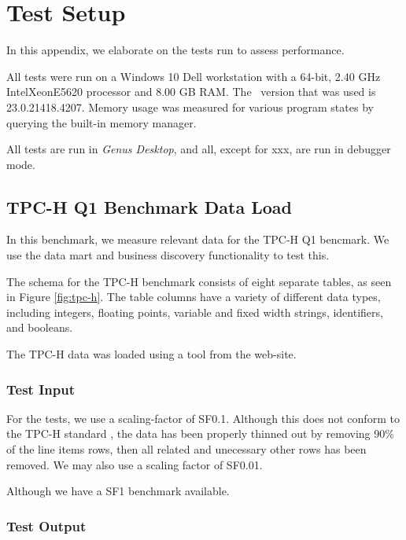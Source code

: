 \chapter{Test Setup}
\label{app:test-setup}
In this appendix, we elaborate on the tests run to assess performance.

All tests were run on a Windows 10 Dell workstation with a 64-bit, 2.40 GHz Intel\textregistered Xeon\textregistered E5620 processor and 8.00 GB RAM. The \delphi~version that was used is 23.0.21418.4207. Memory usage was measured for various program states by querying the built-in  memory manager.

All tests are run in \textit{Genus Desktop}, and all, except for xxx, are run in debugger mode.


\section{TPC-H Q1 Benchmark Data Load}
\label{sec:TPC-H Q1 Benchmark Data Load}
In this benchmark, we measure relevant data for the TPC-H Q1 bencmark. We use the data mart and business discovery functionality to test this.

The schema for the TPC-H benchmark consists of eight separate tables, as seen in Figure \ref{fig:tpc-h}. The table columns have a variety of different data types, including integers, floating points, variable and fixed width strings, identifiers, and booleans. 

The TPC-H data was loaded using a tool from the web-site.

\subsection{Test Input}
\label{sub:Test Input}
For the tests, we use a scaling-factor of SF0.1. Although this does not conform to the TPC-H standard \cite{Transaction_Processing_Performance_Council_TPC2014}, the data has been properly thinned out by removing 90\% of the line items rows, then all related and unecessary other rows has been removed. We may also use a scaling factor of SF0.01. 

Although we have a SF1 benchmark available.

\subsection{Test Output}
\label{sub:Test Output}

